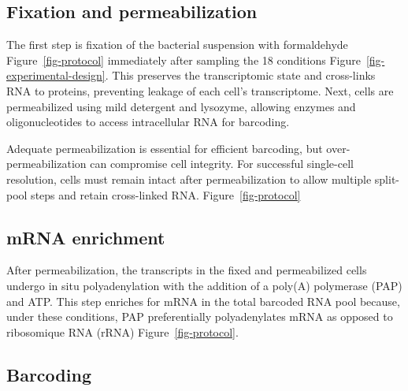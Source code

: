 \documentclass[
  11pt,
  a4paper,
]{report}
\begin{document}
\subsection{Fixation and
permeabilization}\label{fixation-and-permeabilization}

The first step is fixation of the bacterial suspension with formaldehyde
Figure~\ref{fig-protocol} immediately after sampling the 18 conditions
Figure~\ref{fig-experimental-design}. This preserves the transcriptomic
state and cross-links RNA to proteins, preventing leakage of each cell's
transcriptome. Next, cells are permeabilized using mild detergent and
lysozyme, allowing enzymes and oligonucleotides to access intracellular
RNA for barcoding.

\begin{tcolorbox}[enhanced jigsaw, colbacktitle=quarto-callout-note-color!10!white, bottomtitle=1mm, coltitle=black, colframe=quarto-callout-note-color-frame, left=2mm, bottomrule=.15mm, rightrule=.15mm, opacityback=0, toptitle=1mm, colback=white, title=\textcolor{quarto-callout-note-color}{\faInfo}\hspace{0.5em}{Note}, arc=.35mm, toprule=.15mm, breakable, leftrule=.75mm, opacitybacktitle=0.6, titlerule=0mm]

Adequate permeabilization is essential for efficient barcoding, but
over-permeabilization can compromise cell integrity. For successful
single-cell resolution, cells must remain intact after permeabilization
to allow multiple split-pool steps and retain cross-linked RNA.
Figure~\ref{fig-protocol}

\end{tcolorbox}

\subsection{mRNA enrichment}\label{mrna-enrichment}

After permeabilization, the transcripts in the fixed and permeabilized
cells undergo in situ polyadenylation with the addition of a poly(A)
polymerase (PAP) and ATP. This step enriches for mRNA in the total
barcoded RNA pool because, under these conditions, PAP preferentially
polyadenylates mRNA as opposed to ribosomique RNA (rRNA)
Figure~\ref{fig-protocol}.

\subsection{Barcoding}\label{barcoding}
\end{document}
